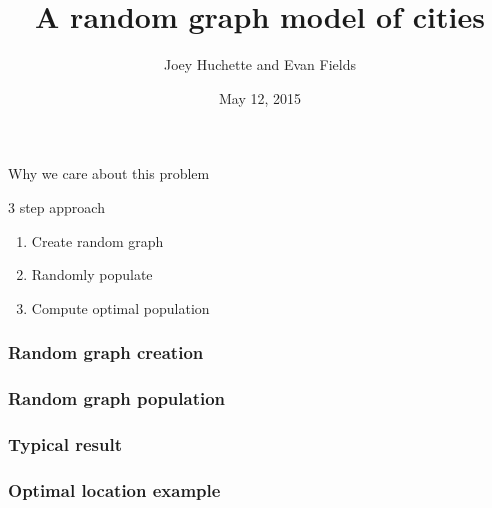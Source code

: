\documentclass[11pt]{beamer}
\title{A random graph model of cities}
\author{Joey Huchette and Evan Fields}
\institute{6.268}
\date{May 12, 2015}
\begin{document}
\begin{frame}
\titlepage
\end{frame}

\begin{frame}
Why we care about this problem
\end{frame}

\begin{frame}
3 step approach
\begin{enumerate}
\item Create random graph
\item Randomly populate
\item Compute optimal population
\end{enumerate}
\end{frame}

\begin{frame}
\frametitle{Random graph creation}

\end{frame}

\begin{frame}
\frametitle{Random graph population}

\end{frame}


\begin{frame}
\frametitle{Typical result}

\end{frame}

\begin{frame}
\frametitle{Optimal location example}
\end{frame}
\end{document}

